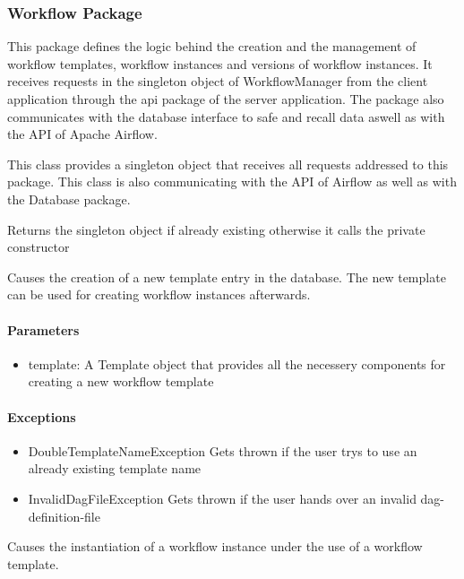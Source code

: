 \subsubsection{Workflow Package}
This package defines the logic behind the creation and the management of workflow templates, workflow instances and versions of workflow instances. It receives requests in the singleton object of WorkflowManager from the client application through the api package of the server application. The package also communicates with the database interface to safe and recall data aswell as with the API of Apache Airflow.

This class provides a singleton object that receives all requests addressed to this package. This class is also communicating with the API of Airflow as well as with the Database package.
\methods

Returns the singleton object if already existing otherwise it calls the private constructor

Causes the creation of a new template entry in the database. The new template can be used for creating workflow instances afterwards.

\paragraph{Parameters}
\begin{itemize}
	\item{template:}
	A Template object that provides all the necessery components for creating a new workflow template
\end{itemize}

\paragraph{Exceptions}
\begin{itemize}
	\item{DoubleTemplateNameException}
	Gets thrown if the user trys to use an already existing template name
	\item{InvalidDagFileException}
	Gets thrown if the user hands over an invalid dag-definition-file
\end{itemize}

Causes the instantiation of a workflow instance under the use of a workflow template. 

